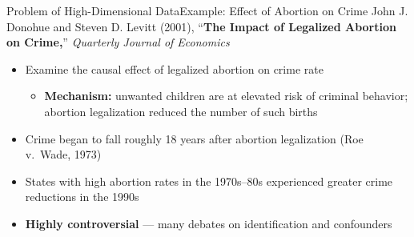 \documentclass[hyperref={pdfpagelabels=false}]{beamer}
\begin{document}
	
	\begin{frame}{Problem of High-Dimensional Data}{Example: Effect of Abortion on Crime}
    John J. Donohue and Steven D. Levitt (2001), ``\textbf{The Impact of 
    Legalized Abortion on Crime,}'' \textit{Quarterly Journal of Economics}

    \begin{itemize}
        \item Examine the causal effect of legalized abortion on crime rate
        \vspace{0.2cm}
        \begin{itemize}
            \item \textbf{Mechanism:} unwanted children are at elevated 
            risk of criminal behavior; abortion legalization reduced 
            the number of such births
        \end{itemize}
        \vspace{0.2cm}
        \item Crime began to fall roughly 18 years after abortion 
        legalization (Roe v.\ Wade, 1973)
        \vspace{0.2cm}
        \item States with high abortion rates in the 1970s--80s 
        experienced greater crime reductions in the 1990s
        \vspace{0.2cm}
        \item \textbf{Highly controversial} --- many debates on 
        identification and confounders
    \end{itemize}
\end{frame}
\end{document}
